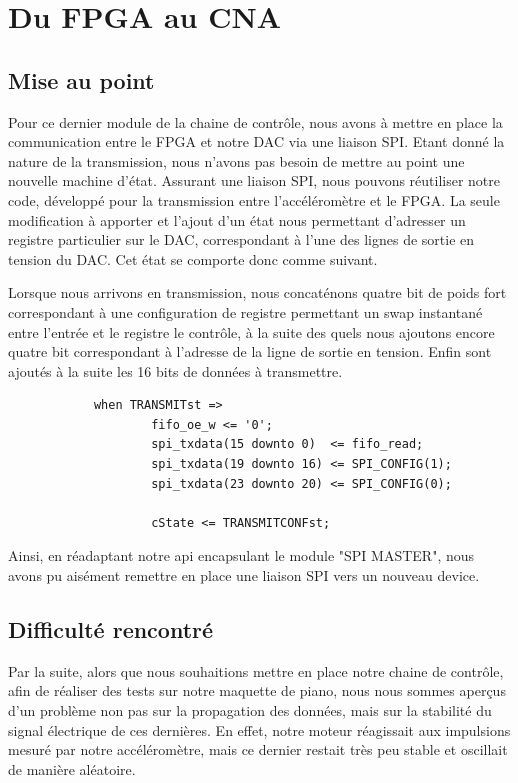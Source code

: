 \documentclass[french,a4paper,12pt]{report}
\begin{document}
	\chapter{Du FPGA au CNA}
	
	\section{Mise au point}
	
	Pour ce dernier module de la chaine de contrôle, nous avons à mettre en place la communication entre le FPGA et notre DAC via une liaison SPI. Etant donné la nature de la transmission, nous n'avons pas besoin de mettre au point une nouvelle machine d'état. Assurant une liaison SPI, nous pouvons réutiliser notre code, développé pour la transmission entre l'accéléromètre et le FPGA. La seule modification à apporter et l'ajout d'un état nous permettant d'adresser un registre particulier sur le DAC, correspondant à l'une des lignes de sortie en tension du DAC. Cet état se comporte donc comme suivant.
	
	Lorsque nous arrivons en transmission, nous concaténons quatre bit de poids fort correspondant à une configuration de registre permettant un swap instantané entre l'entrée et le registre le contrôle, à la suite des quels nous ajoutons encore quatre bit correspondant à l'adresse de la ligne de sortie en tension. Enfin sont ajoutés à la suite les 16 bits de données à transmettre.
	
		\begin{lstlisting}
 			when TRANSMITst =>
					fifo_oe_w <= '0';
					spi_txdata(15 downto 0)	 <= fifo_read;
					spi_txdata(19 downto 16) <= SPI_CONFIG(1);
					spi_txdata(23 downto 20) <= SPI_CONFIG(0);
					
					cState <= TRANSMITCONFst;
		\end{lstlisting}
		
		Ainsi, en réadaptant notre api encapsulant le module "SPI MASTER", nous avons pu aisément remettre en place une liaison SPI vers un nouveau device.
		
		\section{Difficulté rencontré}
		
		Par la suite, alors que nous souhaitions mettre en place notre chaine de contrôle, afin de réaliser des tests sur notre maquette de piano, nous nous sommes aperçus d'un problème non pas sur la propagation des données, mais sur la stabilité du signal électrique de ces dernières. En effet, notre moteur réagissait aux impulsions mesuré par notre accéléromètre, mais ce dernier restait très peu stable et oscillait de manière aléatoire.
		
\end{document}
